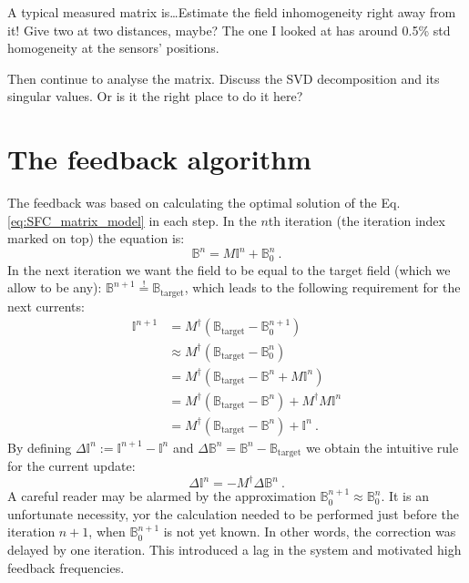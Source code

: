 A typical measured matrix is\ldots Estimate the field inhomogeneity right away from it! Give two at two distances, maybe? The one I looked at has around 0.5\% std homogeneity at the sensors' positions.

Then continue to analyse the matrix. Discuss the SVD decomposition and its singular values. Or is it the right place to do it here?




\section{The feedback algorithm}
The feedback was based on calculating the optimal solution of the Eq.\,\ref{eq:SFC_matrix_model} in each step. In the $n$th iteration (the iteration index marked on top) the equation is:
\begin{equation}
  \mathbb{B}^n = M \mathbb{I}^n + \mathbb{B}_0^n \ .
\end{equation}
In the next iteration we want the field to be equal to the target field (which we allow to be any): $\mathbb{B}^{n+1} \overset{!}{=} \mathbb{B}_\text{target}$, which leads to the following requirement for the next currents:
\begin{align}
  \mathbb{I}^{n+1} &=
    M^\dagger \left( \mathbb{B}_\text{target} - \mathbb{B}_0^{n+1} \right) \nonumber \\
    &\approx M^\dagger \left( \mathbb{B}_\text{target} - \mathbb{B}_0^{n} \right) \nonumber \\
    &= M^\dagger \left( \mathbb{B}_\text{target} - \mathbb{B}^n + M \mathbb{I}^n \right) \nonumber \\
    &= M^\dagger \left( \mathbb{B}_\text{target} - \mathbb{B}^n \right) + M^\dagger M \mathbb{I}^n \nonumber \\
    &= M^\dagger \left( \mathbb{B}_\text{target} - \mathbb{B}^n \right) + \mathbb{I}^n \ . \label{eq:current_update}
\end{align}
By defining $\Delta\mathbb{I}^n := \mathbb{I}^{n+1} - \mathbb{I}^{n}$ and $\Delta\mathbb{B}^n = \mathbb{B}^n - \mathbb{B}_\text{target}$ we obtain the intuitive rule for the current update:
\begin{equation}
  \Delta\mathbb{I}^n = - M^\dagger \Delta\mathbb{B}^n \ .
\end{equation}
A careful reader may be alarmed by the approximation $\mathbb{B}_0^{n+1} \approx \mathbb{B}_0^{n}$. It is an unfortunate necessity, yor the calculation needed to be performed just before the iteration $n+1$, when $\mathbb{B}_0^{n+1}$ is not yet known. In other words, the correction was delayed by one iteration. This introduced a lag in the system and motivated high feedback frequencies.

